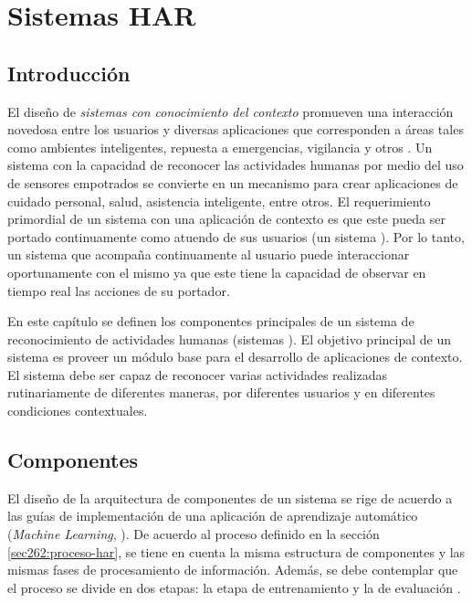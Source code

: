 
\chapter{Sistemas HAR }

\label{chap4:sistemas-de-reconocimiento}

\section{Introducción}

\label{sec41:introduccion}El diseño de \emph{sistemas con conocimiento
del contexto} promueven una interacción novedosa entre los usuarios
y diversas aplicaciones que corresponden a áreas tales como ambientes
inteligentes, repuesta a emergencias, vigilancia y otros \cite{Choudhury2008}.
Un sistema con la capacidad de reconocer las actividades humanas por
medio del uso de sensores empotrados se convierte en un mecanismo
para crear aplicaciones de cuidado personal, salud, asistencia inteligente,
entre otros. El requerimiento primordial de un sistema con una aplicación
de contexto es que este pueda ser portado continuamente como atuendo
de sus usuarios (un sistema ). Por lo tanto, un sistema
que acompaña continuamente al usuario puede interaccionar oportunamente
con el mismo ya que este tiene la capacidad de observar en tiempo
real las acciones de su portador. 

En este capítulo se definen los componentes principales de un sistema
de reconocimiento de actividades humanas (sistemas ). El
objetivo principal de un sistema  es proveer un módulo
base para el desarrollo de aplicaciones de contexto. El sistema debe
ser capaz de reconocer varias actividades realizadas rutinariamente
de diferentes maneras, por diferentes usuarios y en diferentes condiciones
contextuales. 

\section{Componentes}

\label{sec42:componentes}El diseño de la arquitectura de componentes
de un sistema  se rige de acuerdo a las guías de implementación
de una aplicación de aprendizaje automático (\emph{Machine Learning},
). De acuerdo al proceso definido en la sección \ref{sec262:proceso-har},
se tiene en cuenta la misma estructura de componentes y las mismas
fases de procesamiento de información. Además, se debe contemplar
que el proceso se divide en dos etapas: la etapa de entrenamiento
y la de evaluación \cite{LaraLabrador2013}. 

